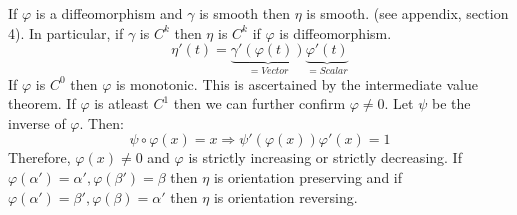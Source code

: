 \documentclass[oneside]{book}\twocolumn
\begin{document}
If $\varphi$ is a diffeomorphism and $\gamma$ is smooth then $\eta$ is smooth. (see appendix, section 4). In particular, if $\gamma$ is $C^k$ then $\eta$ is $C^k$ if $\varphi$ is diffeomorphism. 
$$\eta'(t)=\underbrace{\gamma'(\varphi(t))}_{=Vector}\underbrace{\varphi'(t)}_{=Scalar}$$
If $\varphi$ is $C^0$ then $\varphi$ is monotonic. This is ascertained by the intermediate value theorem. If $\varphi$ is atleast $C^1$ then we can further confirm $\varphi\ne 0$. Let $\psi$ be the inverse of $\varphi$. Then:
$$\psi\circ \varphi(x)=x\Rightarrow \psi'(\varphi(x))\varphi'(x)=1$$
Therefore, $\varphi(x)\ne0$ and $\varphi$ is strictly increasing or strictly decreasing. If $\varphi(\alpha')=\alpha',\varphi(\beta')=\beta$ then $\eta$ is orientation preserving and if  $\varphi(\alpha')=\beta',\varphi(\beta)=\alpha'$ then $\eta$ is orientation reversing. 
\end{document}
